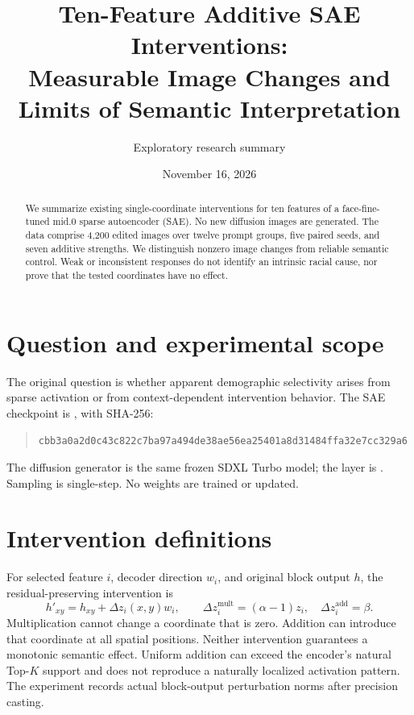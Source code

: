 \documentclass[11pt]{article}
\title{Ten-Feature Additive SAE Interventions:\\ Measurable Image Changes and Limits of Semantic Interpretation}
\author{Exploratory research summary}
\date{November 16, 2026}
\begin{document}
\maketitle
\begin{abstract}
We summarize existing single-coordinate interventions for ten features of a face-fine-tuned mid.0 sparse autoencoder (SAE). No new diffusion images are generated. The data comprise 4,200 edited images over twelve prompt groups, five paired seeds, and seven additive strengths. We distinguish nonzero image changes from reliable semantic control. Weak or inconsistent responses do not identify an intrinsic racial cause, nor prove that the tested coordinates have no effect.
\end{abstract}
\section{Question and experimental scope}
The original question is whether apparent demographic selectivity arises from sparse activation or from context-dependent intervention behavior. The SAE checkpoint is , with SHA-256:
\begin{quote}\scriptsize\texttt{cbb3a0a2d0c43c822c7ba97a494de38ae56ea25401a8d31484ffa32e7cc329a6}\end{quote}
 The diffusion generator is the same frozen SDXL Turbo model; the layer is . Sampling is single-step. No weights are trained or updated.
\section{Intervention definitions}
For selected feature $i$, decoder direction $w_i$, and original block output $h$, the residual-preserving intervention is
\[
 h'_{xy}=h_{xy}+\Delta z_i(x,y)w_i,\qquad
 \Delta z_i^{\mathrm{mult}}=(\alpha-1)z_i,\quad
 \Delta z_i^{\mathrm{add}}=\beta.
\]
Multiplication cannot change a coordinate that is zero. Addition can introduce that coordinate at all spatial positions. Neither intervention guarantees a monotonic semantic effect. Uniform addition can exceed the encoder's natural Top-$K$ support and does not reproduce a naturally localized activation pattern. The experiment records actual block-output perturbation norms after precision casting.
\end{document}
